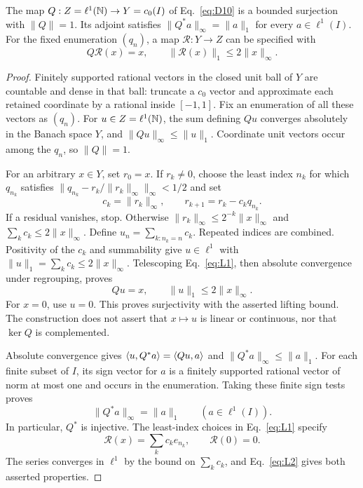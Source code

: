 \begin{lemma}
\label{lem:specified-quotient}
The map $Q:Z=\ell^1(\mathbb N)\to Y=c_0(I)$ of Eq.~\eqref{eq:D10} is a
bounded surjection with $\|Q\|=1$. Its adjoint satisfies
$\|Q^*a\|_\infty=\|a\|_1$ for every $a\in\ell^1(I)$.
For the fixed enumeration $(q_n)$, a map $\mathcal R:Y\to Z$ can be
specified with
\[
Q\mathcal R(x)=x,\qquad \|\mathcal R(x)\|_1\le2\|x\|_\infty.
\]
\end{lemma}
\begin{proof}
\label{sec:L1}
Finitely supported rational vectors in the closed unit ball of $Y$ are
countable and dense in that ball: truncate a $c_0$ vector and approximate
each retained coordinate by a rational inside $[-1,1]$. Fix an enumeration
of all these vectors as $(q_n)$. For $u\in Z=\ell^1(\mathbb N)$, the sum defining
$Qu$ converges absolutely in the Banach space $Y$, and
$\|Qu\|_\infty\le\|u\|_1$. Coordinate unit vectors occur among the $q_n$,
so $\|Q\|=1$.

For an arbitrary $x\in Y$, set $r_0=x$. If $r_k\ne0$, choose the least index $n_k$ for which
$q_{n_k}$ satisfies $\|q_{n_k}-r_k/\|r_k\|_\infty\|_\infty<1/2$ and set
\begin{equation}
c_k=\|r_k\|_\infty,\qquad r_{k+1}=r_k-c_kq_{n_k}.
\label{eq:L1}
\end{equation}
If a residual vanishes, stop. Otherwise
$\|r_k\|_\infty\le2^{-k}\|x\|_\infty$ and $\sum_k c_k\le2\|x\|_\infty$.
Define $u_n=\sum_{k:n_k=n}c_k$. Repeated indices are combined.
Positivity of the $c_k$ and summability give $u\in\ell^1$ with
$\|u\|_1=\sum_k c_k\le2\|x\|_\infty$.
Telescoping Eq.~\eqref{eq:L1}, then absolute convergence under regrouping,
proves
\begin{equation}
Qu=x,\qquad \|u\|_1\le2\|x\|_\infty.
\label{eq:L2}
\end{equation}
For $x=0$, use $u=0$. This proves surjectivity with the asserted lifting
bound. The construction does not assert that $x\mapsto u$ is linear or
continuous, nor that $\ker Q$ is complemented.

\label{sec:L2}
Absolute convergence gives $\langle u,Q^*a\rangle=\langle Qu,a\rangle$ and
$\|Q^*a\|_\infty\le\|a\|_1$. For each finite subset of $I$, its sign
vector for $a$ is a finitely supported rational vector of norm at most
one and occurs in the enumeration. Taking these finite sign tests proves
\begin{equation}
\|Q^*a\|_\infty=\|a\|_1\qquad(a\in\ell^1(I)).
\label{eq:L3}
\end{equation}
In particular, $Q^*$ is injective. The least-index choices in
Eq.~\eqref{eq:L1} specify
\[
\mathcal R(x)=\sum_k c_k e_{n_k},\qquad \mathcal R(0)=0.
\]
The series converges in $\ell^1$ by the bound on $\sum_k c_k$,
and Eq.~\eqref{eq:L2} gives both asserted properties.
\end{proof}

